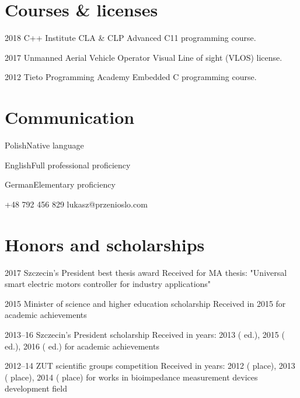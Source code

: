 \documentclass{tccv}
\begin{document}
\section{Courses \& licenses}

\begin{yearlist}

\item{2018}
     {C++ Institute CLA \& CLP}
     {Advanced C11 programming course.}

\item{2017}
     {Unmanned Aerial Vehicle Operator}
     {Visual Line of sight (VLOS) license.}

\item{2012}
     {Tieto Programming Academy}
     {Embedded C programming course.}

\end{yearlist}

\section{Communication}

\begin{factlist}
\item{Polish}{Native language}
\item{English}{Full professional proficiency}
\item{German}{Elementary proficiency}
\end{factlist}

    {+48 792 456 829}
    {lukasz@przenioslo.com}
    
\section{Honors and scholarships}

\begin{yearlist}

\item{2017}
     {Szczecin's President best thesis award}
     {Received for MA thesis: "Universal smart electric motors controller for industry applications"} 
     
\item{2015}
     {Minister of science and higher education scholarship}
     {Received in 2015 for academic achievements} 
     
\item{2013--16}
     {Szczecin's President scholarship}
     {Received in years: 2013 ( ed.), 2015 ( ed.), 2016 ( ed.) for academic achievements} 

\item{2012--14}
     {ZUT scientific groups competition}
     {Received in years: 2012 ( place), 2013 ( place), 2014 ( place) for works in bioimpedance measurement devices development field} 
    
\end{yearlist}
\end{document}
